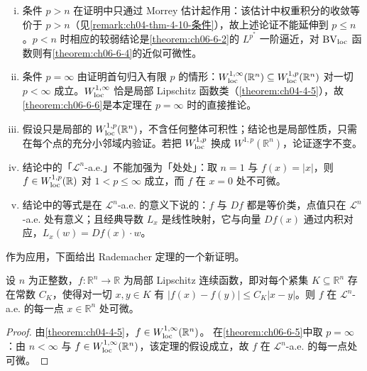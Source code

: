 \documentclass[../../main.tex]{subfiles}%
\begin{document}
\begin{remark}\label{remark:ch06-thm-6-5-条件}
\begin{enumerate}[(i)]
\item 条件 $p>n$ 在证明中只通过 Morrey 估计起作用：该估计中权重积分的收敛等价于 $p>n$（见\cref{remark:ch04-thm-4-10-条件}），故上述论证不能延伸到 $p\leqslant n$。$p<n$ 时相应的较弱结论是\cref{theorem:ch06-6-2}的 $L^{p^{*}}$ 一阶逼近，对 $\mathrm{BV}_{\mathrm{loc}}$ 函数则有\cref{theorem:ch06-6-4}的近似可微性。%
\item 条件 $p=\infty$ 由证明首句归入有限 $p$ 的情形：$W^{1,\infty}_{\mathrm{loc}}(\mathbb{R}^n)\subseteq W^{1,p}_{\mathrm{loc}}(\mathbb{R}^n)$ 对一切 $p<\infty$ 成立。$W^{1,\infty}_{\mathrm{loc}}$ 恰是局部 Lipschitz 函数类（\cref{theorem:ch04-4-5}），故\cref{theorem:ch06-6-6}是本定理在 $p=\infty$ 时的直接推论。%
\item 假设只是局部的 $W^{1,p}_{\mathrm{loc}}(\mathbb{R}^n)$，不含任何整体可积性；结论也是局部性质，只需在每个点的充分小邻域内验证。若把 $W^{1,p}_{\mathrm{loc}}$ 换成 $W^{1,p}(\mathbb{R}^n)$，论证逐字不变。
\item 结论中的「$\mathcal{L}^{n}$-a.e.」不能加强为「处处」：取 $n=1$ 与 $f(x)=\lvert x\rvert$，则 $f\in W^{1,p}_{\mathrm{loc}}(\mathbb{R})$ 对 $1<p\leqslant\infty$ 成立，而 $f$ 在 $x=0$ 处不可微。
\item 结论中的等式是在 $\mathcal{L}^{n}$-a.e. 的意义下说的：$f$ 与 $Df$ 都是等价类，点值只在 $\mathcal{L}^{n}$-a.e. 处有意义；且经典导数 $L_{x}$ 是线性映射，它与向量 $Df(x)$ 通过内积对应，$L_{x}(w)=Df(x)\cdot w$。
\end{enumerate}
\end{remark}

作为应用，下面给出 Rademacher 定理的一个新证明。

\begin{theorem}\label{theorem:ch06-6-6}
设 $n$ 为正整数，$f:\mathbb{R}^n\to\mathbb{R}$ 为局部 Lipschitz 连续函数，即对每个紧集 $K\subseteq\mathbb{R}^n$ 存在常数 $C_{K}$，使得对一切 $x,y\in K$ 有 $\lvert f(x)-f(y)\rvert\leqslant C_{K}\lvert x-y\rvert$。则 $f$ 在 $\mathcal{L}^{n}$-a.e. 的每一点 $x\in\mathbb{R}^n$ 处可微。
\end{theorem}

\begin{proof}
由\cref{theorem:ch04-4-5}，$f\in W^{1,\infty}_{\mathrm{loc}}(\mathbb{R}^n)$。%
在\cref{theorem:ch06-6-5}中取 $p=\infty$：由 $n<\infty$ 与 $f\in W^{1,\infty}_{\mathrm{loc}}(\mathbb{R}^n)$，该定理的假设成立，故 $f$ 在 $\mathcal{L}^{n}$-a.e. 的每一点处可微。%
\end{proof}
\end{document}

